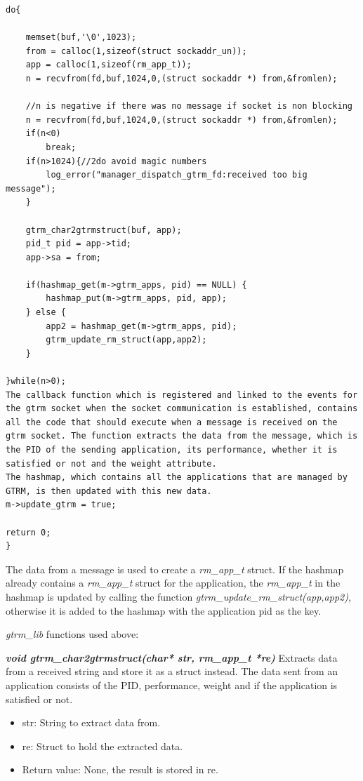 \documentclass[nobiblatex]{LTHthesis}
\begin{document}
\begin{verbatim}
do{		

	memset(buf,'\0',1023);
	from = calloc(1,sizeof(struct sockaddr_un));
	app = calloc(1,sizeof(rm_app_t));	
	n = recvfrom(fd,buf,1024,0,(struct sockaddr *) from,&fromlen);

	//n is negative if there was no message if socket is non blocking
	n = recvfrom(fd,buf,1024,0,(struct sockaddr *) from,&fromlen);
	if(n<0)
		break;
	if(n>1024){//2do avoid magic numbers
		log_error("manager_dispatch_gtrm_fd:received too big message");
	}	

	gtrm_char2gtrmstruct(buf, app);
	pid_t pid = app->tid;
	app->sa = from;

	if(hashmap_get(m->gtrm_apps, pid) == NULL) {
		hashmap_put(m->gtrm_apps, pid, app);
	} else {
		app2 = hashmap_get(m->gtrm_apps, pid);
		gtrm_update_rm_struct(app,app2);
	}															

}while(n>0);
The callback function which is registered and linked to the events for the gtrm socket when the socket communication is established, contains all the code that should execute when a message is received on the gtrm socket. The function extracts the data from the message, which is the PID of the sending application, its performance, whether it is satisfied or not and the weight attribute. 
The hashmap, which contains all the applications that are managed by GTRM, is then updated with this new data. 
m->update_gtrm = true;

return 0;
}
\end{verbatim}

The data from a message is used to create a \emph{rm\_app\_t} struct. If the hashmap already contains a \emph{rm\_app\_t} struct for the application, the \emph{rm\_app\_t} in the hashmap is updated by calling the function 
\emph{gtrm\_update\_rm\_struct(app,app2)}, otherwise it is added to the hashmap with the application pid as the key.

\emph{gtrm\_lib} functions used above:


\begin{framed}
		\begin{flushleft}
			\textbf{\emph{void gtrm\_char2gtrmstruct(char* str, rm\_app\_t *re)}}
			Extracts data from a received string and store it as a struct instead. The data sent from an application consists of the PID, performance, weight and if the application is satisfied or not.
			\begin{itemize} 
			\item str: String to extract data from.
			\item re: Struct to hold the extracted data.
			\item Return value: None, the result is stored in re.
			\end{itemize}
		\end{flushleft}	
\end{framed}
\end{document}
